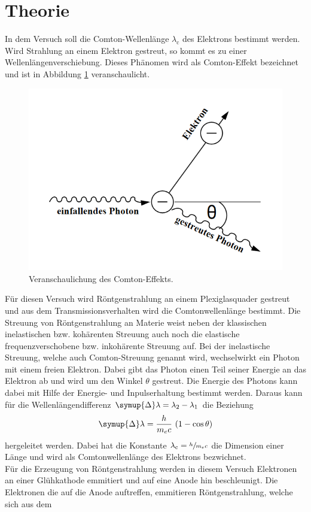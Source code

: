 \section{Theorie}
\label{sec:Theorie}
In dem Versuch soll die Comton-Wellenlänge $\lambda_\text{c}$ des Elektrons bestimmt werden.
Wird Strahlung an einem Elektron gestreut, so kommt es zu einer Wellenlängenverschiebung. Dieses Phänomen wird als Comton-Effekt bezeichnet und ist in Abbildung \ref{fig:com} veranschaulicht.
\begin{figure}
    \centering
    \caption{Veranschaulichung des Comton-Effekts.\cite{V603}}
    \label{fig:com}
    \includegraphics[width = 0.6 \textwidth]{pics/comton.png}
\end{figure}
Für diesen Versuch wird Röntgenstrahlung an einem Plexiglasquader gestreut und aus dem Transmissionsverhalten wird die Comtonwellenlänge bestimmt.
Die Streuung von Röntgenstrahlung an Materie weist neben der klassischen inelastischen bzw. kohärenten Streuung auch noch die elastische frequenzverschobene bzw. inkohärente Streuung auf.
Bei der inelastische Streuung, welche auch Comton-Streuung genannt wird, wechselwirkt ein Photon mit einem freien Elektron. Dabei gibt das Photon einen Teil seiner Energie an das Elektron ab und wird um den Winkel $\theta$ gestreut. 
Die Energie des Photons kann dabei mit Hilfe der Energie- und Inpulserhaltung bestimmt werden. Daraus kann für die Wellenlängendifferenz $\symup{\Delta}\lambda = \lambda_2 - \lambda_1$ die Beziehung
\begin{equation}
    \symup{\Delta}\lambda= \frac{h}{m_e c} \, \left(1-\cos \theta\right)
    \label{eqn:comton}
\end{equation} 
hergeleitet werden. Dabei hat die Konstante $\lambda_\text{c}= \sfrac{h}{m_e c}$ die Dimension einer Länge und wird als Comtonwellenlänge des Elektrons bezwichnet.
\\
Für die Erzeugung von Röntgenstrahlung werden in diesem Versuch Elektronen an einer Glühkathode emmitiert und auf eine Anode hin beschleunigt. Die Elektronen die auf die Anode auftreffen, emmitieren Röntgenstrahlung, welche sich aus dem
